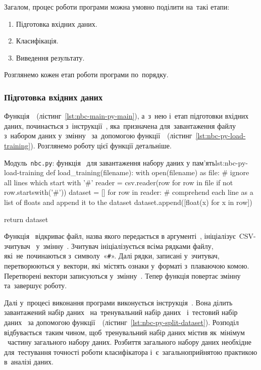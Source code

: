 \documentclass[
	a4paper,
	oneside,
	DIV = 12,
	fontsize = 13pt,
	headings = normal,
	numbers = endperiod,
]{scrartcl}
\theoremstyle{mythm}
\newcommand{\allcaps}[1]{{\addfontfeatures{LetterSpace = 8, Kerning = Off}#1}}
\newcommand{\filename}[1]{\texttt{#1}}
\begin{document}
				Загалом, процес роботи програми можна умовно поділити на~такі етапи:
				\begin{enumerate}
					\item Підготовка вхідних даних.
					\item Класифікація.
					\item Виведення результату.
				\end{enumerate}

				Розглянемо кожен етап роботи програми по~порядку.

				\subsubsection{Підготовка вхідних даних}

					Функція~~(лістинг~\ref{lst:nbc-main-py-main}), а~з~нею і~етап підготовки вхідних даних, починається з~інструкції~, яка~призначена для~завантаження файлу з~набором даних у~змінну~ за~допомогою функції~~(лістинг~\ref{lst:nbc-py-load-training}). Розглянемо роботу цієї функції детальніше.

					\begin{listingpython}{Модуль~\filename{nbc.py}: функція~ для завантаження набору даних у пам'ять}{lst:nbc-py-load-training}
	def load_training(filename):
			with open(filename) as file:
					# ignore all lines which start with '#'
					reader = csv.reader(row for row in file if not row.startswith('#'))
					dataset = []
					for row in reader:
							# comprehend each line as a list of floats and append it to the dataset
							dataset.append([float(x) for x in row])

			return dataset
					\end{listingpython}

					Функція~ відкриває файл, назва якого передається в аргументі~, ініціалізує~\textenglish{\allcaps{CSV}}-зчитувач~ у~змінну~. Зчитувач ініціалізується всіма рядками файлу, які~не~починаються з~символу~«\verb|#|». Далі рядки, записані у~зчитувач, перетворюються у~вектори, які~містять ознаки у~форматі з~плаваючою комою. Перетворені вектори записуються у~змінну~. Тепер функція повертає змінну~ та~завершує роботу.

					Далі у~процесі виконання програми виконується інструкція~. Вона ділить завантажений набір даних~ на~тренувальний набір даних~ і~тестовий набір даних~ за допомогою функції~~(лістинг~\ref{lst:nbc-py-split-dataset}). Розподіл відбувається~таким чином, щоб~тренувальний набір даних  містив як~мінімум ~частину загального набору даних. Розбиття загального набору даних необхідне для~тестування точності роботи класифікатора і~є~загальноприйнятою практикою в~аналізі даних. 
\end{document}
